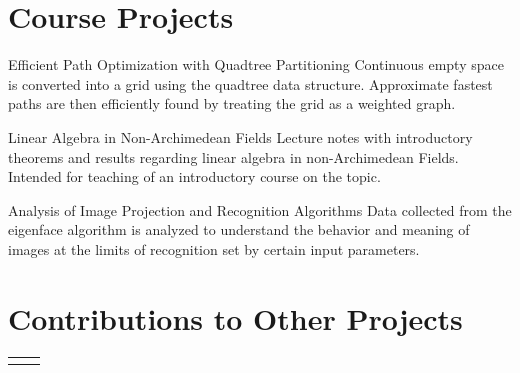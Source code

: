 \documentclass[
  9pt, %
]{FreemanCV}
\begin{document}
\begin{paracol}{2}
\section{Course Projects}

\paper
  {Efficient Path Optimization with Quadtree Partitioning}
  {Continuous empty space is converted into a grid using the quadtree data structure.
   Approximate fastest paths are then efficiently found by treating the grid as a
   weighted graph.}

\paper
  {Linear Algebra in Non-Archimedean Fields}
  {Lecture notes with introductory theorems and results regarding linear algebra
   in non-Archimedean Fields. Intended for teaching of an introductory course on
   the topic.}

\paper
  {Analysis of Image Projection and Recognition Algorithms}
  {Data collected from the eigenface algorithm is analyzed to understand the
   behavior and meaning of images at the limits of recognition set by certain
   input parameters.}


\section{Contributions to Other Projects}

\begin{supertabular}{r >{\raggedright\arraybackslash}p{.65\linewidth}}





\end{supertabular}




\end{paracol}
\end{document}
